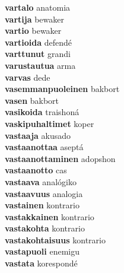 \textbf{vartalo } anatomia \\
\textbf{vartija } bewaker \\
\textbf{vartio } bewaker \\
\textbf{vartioida } defendé \\
\textbf{varttunut } grandi \\
\textbf{varustautua } arma \\
\textbf{varvas } dede \\
\textbf{vasemmanpuoleinen } bakbort \\
\textbf{vasen } bakbort \\
\textbf{vasikoida } traishoná \\
\textbf{vaskipuhaltimet } koper \\
\textbf{vastaaja } akusado \\
\textbf{vastaanottaa } aseptá \\
\textbf{vastaanottaminen } adopshon \\
\textbf{vastaanotto } cas \\
\textbf{vastaava } analógiko \\
\textbf{vastaavuus } analogia \\
\textbf{vastainen } kontrario \\
\textbf{vastakkainen } kontrario \\
\textbf{vastakohta } kontrario \\
\textbf{vastakohtaisuus } kontrario \\
\textbf{vastapuoli } enemigu \\
\textbf{vastata } korespondé \\
